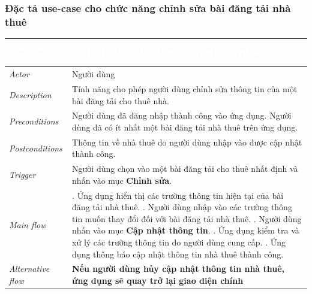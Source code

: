 \subsubsection{Đặc tả use-case cho chức năng chỉnh sửa bài đăng tải nhà thuê}
\begin{center}
    \arrayrulewidth=2pt
    \begin{longtable}{
        |>{\raggedright\arraybackslash}p{3cm}
        |>{\raggedright\arraybackslash}p{13cm}
        |}
        \hline
        \rowcolor{cyan!75!black} \textcolor{white}{\textbf{Use-case name}} & \textcolor{white}{\textbf{CHỈNH SỬA BÀI ĐĂNG TẢI NHÀ THUÊ}}
        \\\hline
        \rowcolor{cyan!10!white} \textit{Actor} & Người dùng
        \\\hdashline
        \rowcolor{cyan!10!white} \textit{Description} & Tính năng cho phép người dùng chỉnh sửa thông tin của một bài đăng tải cho thuê nhà.
        \\\hdashline
        \rowcolor{cyan!10!white} \textit{Preconditions} & Người dùng đã đăng nhập thành công vào ứng dụng. Người dùng đã có ít nhất một bài đăng tải nhà thuê trên ứng dụng.
        \\\hdashline
        \rowcolor{cyan!10!white} \textit{Postconditions} & Thông tin về nhà thuê do người dùng nhập vào được cập nhật thành công.
        \\\hdashline
        \rowcolor{cyan!10!white} \textit{Trigger} & Người dùng chọn vào một bài đăng tải cho thuê nhất định và nhấn vào mục \textbf{Chỉnh sửa}.
        \\\hdashline
        \rowcolor{cyan!10!white} \textit{Main flow} &
        1. Ứng dụng hiển thị các trường thông tin hiện tại của bài đăng tải nhà thuê. \newline
        2. Người dùng nhập vào các trường thông tin muốn thay đổi đối với bài đăng tải nhà thuê. \newline
        3. Người dùng nhấn vào mục \textbf{Cập nhật thông tin}. \newline
        4. Ứng dụng kiểm tra và xử lý các trường thông tin do người dùng cung cấp. \newline
        5. Ứng dụng thông báo cập nhật thông tin nhà thuê thành công.
        \\\hdashline
        \rowcolor{cyan!10!white} \textit{Alternative flow} & 
        \textbf{Nếu người dùng hủy cập nhật thông tin nhà thuê, ứng dụng sẽ quay trở lại giao diện chính} \newline

\end{longtable}
\end{center}
